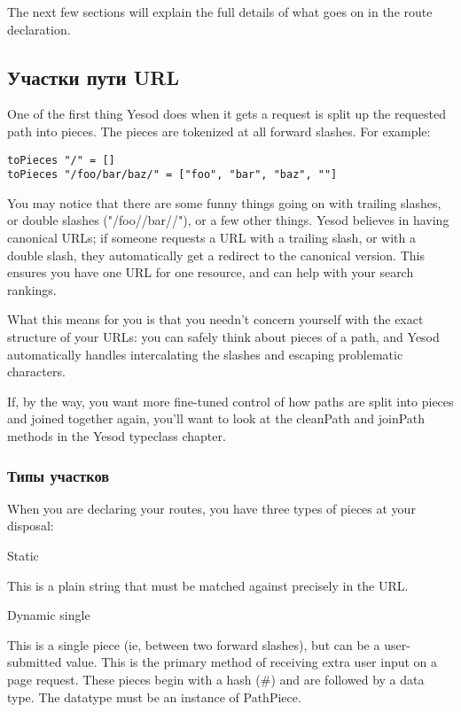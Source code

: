 The next few sections will explain the full details of what goes on in
the route declaration.

\subsection{Участки пути URL}

One of the first thing Yesod does when it gets a request is split up
the requested path into pieces. The pieces are tokenized at all
forward slashes. For example:

\begin{lstlisting}
toPieces "/" = []
toPieces "/foo/bar/baz/" = ["foo", "bar", "baz", ""]
\end{lstlisting}

You may notice that there are some funny things going on with trailing
slashes, or double slashes ("/foo//bar//"), or a few other
things. Yesod believes in having canonical URLs; if someone requests a
URL with a trailing slash, or with a double slash, they automatically
get a redirect to the canonical version. This ensures you have one URL
for one resource, and can help with your search rankings.

What this means for you is that you needn't concern yourself with the
exact structure of your URLs: you can safely think about pieces of a
path, and Yesod automatically handles intercalating the slashes and
escaping problematic characters.

If, by the way, you want more fine-tuned control of how paths are
split into pieces and joined together again, you'll want to look at
the cleanPath and joinPath methods in the Yesod typeclass chapter.

\subsubsection{Типы участков}

When you are declaring your routes, you have three types of pieces at
your disposal:

Static

This is a plain string that must be matched against precisely in the
URL.

Dynamic single

This is a single piece (ie, between two forward slashes), but can be a
user-submitted value. This is the primary method of receiving extra
user input on a page request. These pieces begin with a hash (#) and
are followed by a data type. The datatype must be an instance of
PathPiece.

